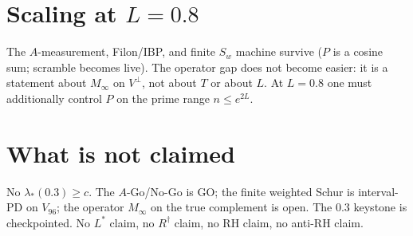 \documentclass[11pt]{article}
\theoremstyle{remark}
\newcommand{\Minf}{M_{\infty}}
\begin{document}
\section{Scaling at $L=0.8$}

The $A$-measurement, Filon/IBP, and finite $S_w$
machine survive ($P$ is a cosine sum; scramble
becomes live).
The operator gap does not become easier: it is a
statement about $\Minf$ on $V^\perp$, not about $T$
or about $L$.
At $L=0.8$ one must additionally control $P$ on the
prime range $n\le e^{2L}$.

\section{What is not claimed}

No $\lambda_*(0.3)\ge c$.
The $A$-Go/No-Go is GO; the finite weighted Schur is
interval-PD on $V_{96}$; the operator $\Minf$ on the
true complement is open.
The $0.3$ keystone is checkpointed.
No $L^*$ claim, no $R^\dagger$ claim, no RH claim,
no anti-RH claim.
\end{document}
